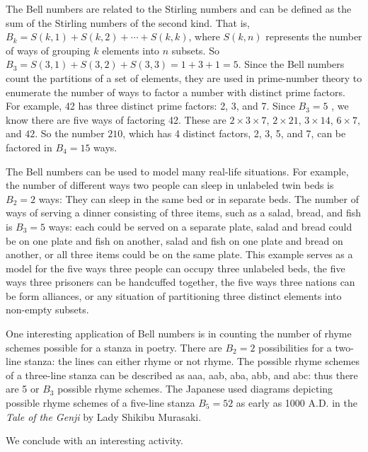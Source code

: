\documentclass[10pt,]{book}
\theoremstyle{plain}
\theoremstyle{definition}
\theoremstyle{definition}
\theoremstyle{definition}
\numberwithin{equation}{chapter}
\begin{document}
\hypertarget{p-1482}{}%
The Bell numbers are related to the Stirling numbers and can be defined as the sum of the Stirling numbers of the second kind. That is, \(B_{k} = S(k,1) + S(k,2) + \cdots + S(k,k)\), where \(S(k,n)\) represents the number of ways of grouping \(k\) elements into \(n\) subsets. So \(B_{3} = S(3,1) + S(3,2) + S(3,3) = 1 + 3 + 1 = 5\). Since the Bell numbers count the partitions of a set of elements, they are used in prime-number theory to enumerate the number of ways to factor a number with distinct prime factors. For example, 42 has three distinct prime factors: 2, 3, and 7. Since \(B_{3} = 5\) , we know there are five ways of factoring 42. These are \(2 \times 3 \times 7\), \(2 \times 21\), \(3 \times 14\), \(6 \times 7\), and \(42\). So the number \(210\), which has 4 distinct factors, 2, 3, 5, and 7, can be factored in \(B_{4} = 15\) ways.%
\par
\hypertarget{p-1483}{}%
The Bell numbers can be used to model many real-life situations. For example, the number of different ways two people can sleep in unlabeled twin beds is \(B_{2} = 2\) ways: They can sleep in the same bed or in separate beds. The number of ways of serving a dinner consisting of three items, such as a salad, bread, and fish is \(B_{3} = 5\) ways: each could be served on a separate plate, salad and bread could be on one plate and fish on another, salad and fish on one plate and bread on another, or all three items could be on the same plate. This example serves as a model for the five ways three people can occupy three unlabeled beds, the five ways three prisoners can be handcuffed together, the five ways three nations can be form alliances, or any situation of partitioning three distinct elements into non-empty subsets.%
\par
\hypertarget{p-1484}{}%
One interesting application of Bell numbers is in counting the number of rhyme schemes possible for a stanza in poetry. There are \(B_{2} = 2\) possibilities for a two-line stanza: the lines can either rhyme or not rhyme. The possible rhyme schemes of a three-line stanza can be described as aaa, aab, aba, abb, and abc: thus there are 5 or \(B_{3}\) possible rhyme schemes. The Japanese used diagrams depicting possible rhyme schemes of a five-line stanza \(B_{5} = 52\) as early as 1000 A.D. in the \emph{Tale of the Genji} by Lady Shikibu Murasaki.%
\par
\hypertarget{p-1485}{}%
We conclude with an interesting activity.%
\end{document}
